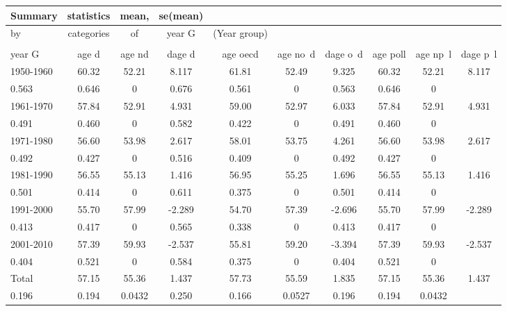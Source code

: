\documentclass[]{article}
\begin{document}
\begin{tabular}{lccccccccc} \hline
Summary & statistics & mean, & se(mean) &  &  &  &  &  &  \\ \hline
by & categories & of & year G & (Year group) &  &  &  &  &  \\
 &  &  &  &  &  &  &  &  &  \\
year G & age d & age nd & dage d & age oecd & age no~d & dage o~d & age poll & age np~l & dage p~l \\
1950-1960 & 60.32 & 52.21 & 8.117 & 61.81 & 52.49 & 9.325 & 60.32 & 52.21 & 8.117 \\
0.563 & 0.646 & 0 & 0.676 & 0.561 & 0 & 0.563 & 0.646 & 0 &  \\
1961-1970 & 57.84 & 52.91 & 4.931 & 59.00 & 52.97 & 6.033 & 57.84 & 52.91 & 4.931 \\
0.491 & 0.460 & 0 & 0.582 & 0.422 & 0 & 0.491 & 0.460 & 0 &  \\
1971-1980 & 56.60 & 53.98 & 2.617 & 58.01 & 53.75 & 4.261 & 56.60 & 53.98 & 2.617 \\
0.492 & 0.427 & 0 & 0.516 & 0.409 & 0 & 0.492 & 0.427 & 0 &  \\
1981-1990 & 56.55 & 55.13 & 1.416 & 56.95 & 55.25 & 1.696 & 56.55 & 55.13 & 1.416 \\
0.501 & 0.414 & 0 & 0.611 & 0.375 & 0 & 0.501 & 0.414 & 0 &  \\
1991-2000 & 55.70 & 57.99 & -2.289 & 54.70 & 57.39 & -2.696 & 55.70 & 57.99 & -2.289 \\
0.413 & 0.417 & 0 & 0.565 & 0.338 & 0 & 0.413 & 0.417 & 0 &  \\
2001-2010 & 57.39 & 59.93 & -2.537 & 55.81 & 59.20 & -3.394 & 57.39 & 59.93 & -2.537 \\
0.404 & 0.521 & 0 & 0.584 & 0.375 & 0 & 0.404 & 0.521 & 0 &  \\
Total & 57.15 & 55.36 & 1.437 & 57.73 & 55.59 & 1.835 & 57.15 & 55.36 & 1.437 \\
 0.196 & 0.194 & 0.0432 & 0.250 & 0.166 & 0.0527 & 0.196 & 0.194 & 0.0432 &  \\ \hline
\end{tabular}
\end{document}
